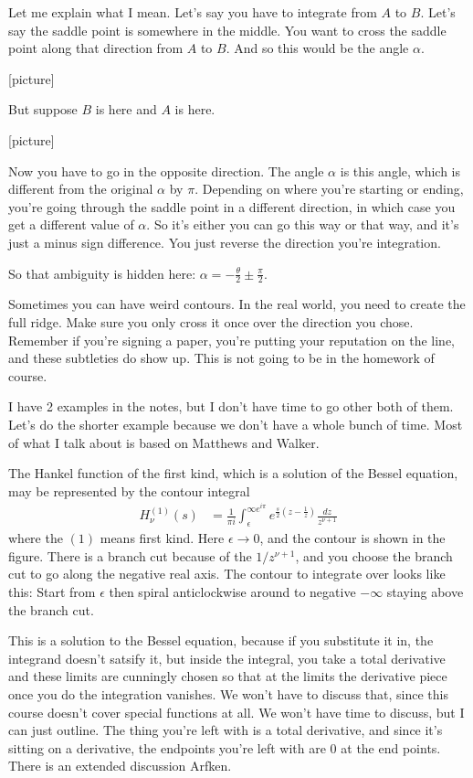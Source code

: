 Let me explain what I mean.
Let's say you have to integrate from $A$ to $B$.
Let's say the saddle point is somewhere in the middle.
You want to cross the saddle point along that direction from $A$ to $B$.
And so this would be the angle $\alpha$.

[picture]

But suppose $B$ is here and $A$ is here.

[picture]

Now you have to go in the opposite direction.
The angle $\alpha$ is this angle,
which is different from the original $\alpha$ by $\pi$.
Depending on where you're starting or ending,
you're going through the saddle point in a different direction,
in which case you get a different value of $\alpha$.
So it's either you can go this way or that way,
and it's just a minus sign difference.
You just reverse the direction you're integration.

So that ambiguity is hidden here:
$\alpha = -\frac{\theta}{2} \pm
\frac{\pi}{2}$.

Sometimes you can have weird contours.
In the real world,
you need to create the full ridge.
Make sure you only cross it once over the direction you chose.
Remember if you're signing a paper,
you're putting your reputation on the line,
and these subtleties do show up.
This is not going to be in the homework of course.

I have 2 examples in the notes,
but I don't have time to go other both of them.
Let's do the shorter example because we don't have a whole bunch of time.
Most of what I talk about is based on Matthews and Walker.

\begin{example}
    The Hankel function of the first kind,
    which is a solution of the Bessel equation,
    may be represented by the contour integral
    \begin{align}
        H_{\nu}^{(1)}(s) &=
        \frac{1}{\pi i}
        \int_{\epsilon}^{\infty e^{i\pi}}
        e^{\frac{s}{2}\left( z - \frac{1}{z} \right)}
        \frac{dz}{z^{\nu + 1}}
    \end{align}
    where the $(1)$ means first kind.
    Here $\epsilon\to 0$, and the contour is shown in the figure.
    There is a branch cut because of the $1/z^{\nu + 1}$,
    and you choose the branch cut to go along the negative real axis.
    The contour to integrate over looks like this:
    Start from $\epsilon$ then spiral anticlockwise around to negative
    $-\infty$ staying above the branch cut.
\end{example}
This is a solution to the Bessel equation,
because if you substitute it in,
the integrand doesn't satsify it,
but inside the integral,
you take a total derivative and these limits are cunningly chosen so that at the
limits the derivative piece once you do the integration vanishes.
We won't have to discuss that,
since this course doesn't cover special functions at all.
We won't have time to discuss,
but I can just outline.
The thing you're left with is a total derivative,
and since it's sitting on a derivative,
the endpoints you're left with are 0 at the end points.
There is an extended discussion Arfken.

